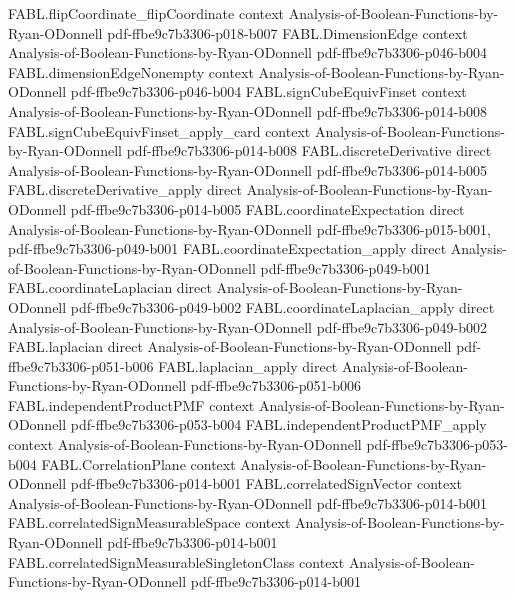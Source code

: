 \begin{theorem}
\proofstep
  {FABL.flipCoordinate_flipCoordinate}
  {context}
  {Analysis-of-Boolean-Functions-by-Ryan-ODonnell}
  {pdf-ffbe9c7b3306-p018-b007}
\proofstep
  {FABL.DimensionEdge}
  {context}
  {Analysis-of-Boolean-Functions-by-Ryan-ODonnell}
  {pdf-ffbe9c7b3306-p046-b004}
\proofstep
  {FABL.dimensionEdgeNonempty}
  {context}
  {Analysis-of-Boolean-Functions-by-Ryan-ODonnell}
  {pdf-ffbe9c7b3306-p046-b004}
\proofstep
  {FABL.signCubeEquivFinset}
  {context}
  {Analysis-of-Boolean-Functions-by-Ryan-ODonnell}
  {pdf-ffbe9c7b3306-p014-b008}
\proofstep
  {FABL.signCubeEquivFinset_apply_card}
  {context}
  {Analysis-of-Boolean-Functions-by-Ryan-ODonnell}
  {pdf-ffbe9c7b3306-p014-b008}
\proofstep
  {FABL.discreteDerivative}
  {direct}
  {Analysis-of-Boolean-Functions-by-Ryan-ODonnell}
  {pdf-ffbe9c7b3306-p014-b005}
\proofstep
  {FABL.discreteDerivative_apply}
  {direct}
  {Analysis-of-Boolean-Functions-by-Ryan-ODonnell}
  {pdf-ffbe9c7b3306-p014-b005}
\proofstep
  {FABL.coordinateExpectation}
  {direct}
  {Analysis-of-Boolean-Functions-by-Ryan-ODonnell}
  {pdf-ffbe9c7b3306-p015-b001,
    pdf-ffbe9c7b3306-p049-b001}
\proofstep
  {FABL.coordinateExpectation_apply}
  {direct}
  {Analysis-of-Boolean-Functions-by-Ryan-ODonnell}
  {pdf-ffbe9c7b3306-p049-b001}
\proofstep
  {FABL.coordinateLaplacian}
  {direct}
  {Analysis-of-Boolean-Functions-by-Ryan-ODonnell}
  {pdf-ffbe9c7b3306-p049-b002}
\proofstep
  {FABL.coordinateLaplacian_apply}
  {direct}
  {Analysis-of-Boolean-Functions-by-Ryan-ODonnell}
  {pdf-ffbe9c7b3306-p049-b002}
\proofstep
  {FABL.laplacian}
  {direct}
  {Analysis-of-Boolean-Functions-by-Ryan-ODonnell}
  {pdf-ffbe9c7b3306-p051-b006}
\proofstep
  {FABL.laplacian_apply}
  {direct}
  {Analysis-of-Boolean-Functions-by-Ryan-ODonnell}
  {pdf-ffbe9c7b3306-p051-b006}
\proofstep
  {FABL.independentProductPMF}
  {context}
  {Analysis-of-Boolean-Functions-by-Ryan-ODonnell}
  {pdf-ffbe9c7b3306-p053-b004}
\proofstep
  {FABL.independentProductPMF_apply}
  {context}
  {Analysis-of-Boolean-Functions-by-Ryan-ODonnell}
  {pdf-ffbe9c7b3306-p053-b004}
\proofstep
  {FABL.CorrelationPlane}
  {context}
  {Analysis-of-Boolean-Functions-by-Ryan-ODonnell}
  {pdf-ffbe9c7b3306-p014-b001}
\proofstep
  {FABL.correlatedSignVector}
  {context}
  {Analysis-of-Boolean-Functions-by-Ryan-ODonnell}
  {pdf-ffbe9c7b3306-p014-b001}
\proofstep
  {FABL.correlatedSignMeasurableSpace}
  {context}
  {Analysis-of-Boolean-Functions-by-Ryan-ODonnell}
  {pdf-ffbe9c7b3306-p014-b001}
\proofstep
  {FABL.correlatedSignMeasurableSingletonClass}
  {context}
  {Analysis-of-Boolean-Functions-by-Ryan-ODonnell}
  {pdf-ffbe9c7b3306-p014-b001}

\end{theorem}
